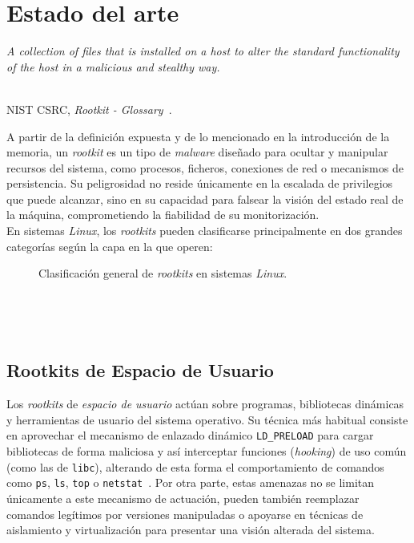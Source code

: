 \chapter{Estado del arte}
\label{cap:capitulo3}

\begin{flushright}
\begin{minipage}[]{10cm}
\emph{\guillemotleft A collection of files that is installed on a host to alter the standard functionality of the host in a malicious and stealthy way.\guillemotright}\\
\end{minipage}\\

NIST CSRC, \textit{Rootkit - Glossary}~\cite{nist_rootkit}.\\
\end{flushright}

A partir de la definición expuesta y de lo mencionado en la introducción de la memoria, un \textit{rootkit} es un tipo de \textit{malware} diseñado para ocultar y manipular recursos del sistema, como procesos, ficheros, conexiones de red o mecanismos de persistencia.
Su peligrosidad no reside únicamente en la escalada de privilegios que puede alcanzar, sino en su capacidad para falsear la visión del estado real de la máquina, comprometiendo la fiabilidad de su monitorización.\\

En sistemas \textit{Linux}, los \textit{rootkits} pueden clasificarse principalmente en dos grandes categorías según la capa en la que operen:\\

\begin{figure}[h!]
  \centering
  \scalebox{0.84}{}
  \caption{Clasificación general de \textit{rootkits} en sistemas \textit{Linux}.}
  \label{fig:rootkits_types}
\end{figure}

\

\

\section{Rootkits de Espacio de Usuario}
\label{sec:user_rootkits}

Los \textit{rootkits} de \textit{espacio de usuario} actúan sobre programas, bibliotecas dinámicas y herramientas de usuario del sistema operativo.
Su técnica más habitual consiste en aprovechar el mecanismo de enlazado dinámico \texttt{LD\_PRELOAD} para cargar bibliotecas de forma maliciosa y así interceptar funciones (\textit{hooking}) de uso común (como las de \texttt{libc}),
alterando de esta forma el comportamiento de comandos como \texttt{ps}, \texttt{ls}, \texttt{top} o \texttt{netstat}~\cite{rootkits}.
Por otra parte, estas amenazas no se limitan únicamente a este mecanismo de actuación, pueden también reemplazar comandos legítimos por versiones manipuladas o apoyarse en técnicas de aislamiento y virtualización para presentar una visión alterada del sistema.\\

